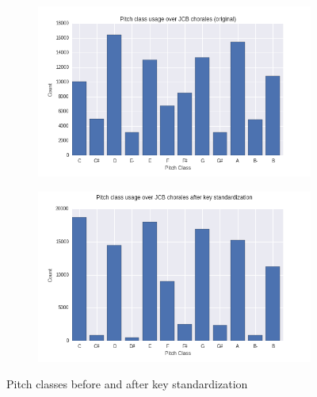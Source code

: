 \begin{figure}
    \centering
    \begin{subfigure}[b]{0.48\textwidth}
        \centering
        \includegraphics[width=1.0\linewidth]{Figures/pitch-class-usage-original.png}
    \end{subfigure}
    \begin{subfigure}[b]{0.48\textwidth}
        \centering
        \includegraphics[width=1.0\linewidth]{Figures/pitch-class-usage-preproc.png}
    \end{subfigure}
    \caption{Pitch classes before and after key standardization}
    \label{fig:pc-key-standardization}
\end{figure}

